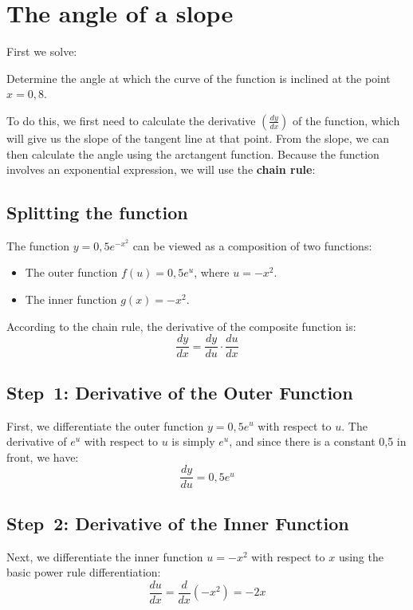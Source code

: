 \documentclass[a4paper,12pt]{article}
\begin{document}
\section{The angle of a slope}
\label{sec:uppg1}
First we solve:\\ %
\begin{addmargin}[1em]{1em}
    Determine the angle at which the curve of the function is inclined at the %
    point $x=0,8$.\\ %
\end{addmargin}
To do this, we first need to calculate the derivative 
$\left(\frac{dy}{dx}\right)$ of the function, which will give us the slope of 
the tangent line at that point. From the slope, we can then calculate the 
angle using the arctangent function. Because the function involves an 
exponential expression, we will use the \textbf{chain rule}:
\subsection{Splitting the function}
The function $y=0,5e^{-x^2}$ can be viewed as a composition of two functions:
\begin{itemize}
    \item The outer function $f(u)=0,5e^u$, where $u=-x^2$. %
    \item The inner function $g(x)=-x^2$.
\end{itemize}
According to the chain rule, the derivative of the composite function is:
\begin{displaymath}
    \frac{dy}{dx} = \frac{dy}{du} \cdot \frac{du}{dx} %
\end{displaymath}
\subsection{Step~1: Derivative of the Outer Function}
First, we differentiate the outer function $y = 0,5e^u$ with respect to $u$. 
The derivative of $e^u$ with respect to $u$ is simply $e^u$, and since there 
is a constant 0,5 in front, we have:
\begin{equation}
    \frac{dy}{du} = 0,5e^u %
\end{equation}
\subsection{Step~2: Derivative of the Inner Function}
Next, we differentiate the inner function $u = -x^2$ with respect to $x$ using 
the basic power rule differentiation:
\begin{equation}
    \frac{du}{dx} = \frac{d}{dx}\left(-x^2\right) = -2x %
\end{equation}
\end{document}
